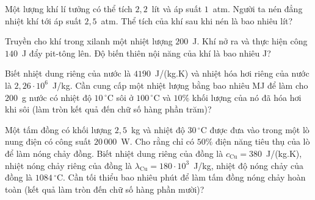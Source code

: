 	\begin{ex}%
		Một lượng khí lí tưởng có thể tích $2{,}2$~lít và áp suất $1$~atm. Người ta nén đẳng nhiệt khí tới áp suất $2{,}5$~atm. Thể tích của khí sau khi nén là bao nhiêu lít?
		\par
	\end{ex}

	\begin{ex}%
		Truyền cho khí trong xilanh một nhiệt lượng $200$~J. Khí nở ra và thực hiện công $140$~J đẩy pit-tông lên. Độ biến thiên nội năng của khí là bao nhiêu J?
		\par
	\end{ex}

	\begin{ex}%
		Biết nhiệt dung riêng của nước là $4190$~J/(kg.K) và nhiệt hóa hơi riêng của nước là $2{,}26\cdot 10^6$~J/kg. Cần cung cấp một nhiệt lượng bằng bao nhiêu MJ để làm cho $200$~g nước có nhiệt độ $10\,^\circ\text{C}$ sôi ở $100\,^\circ\text{C}$ và $10\%$ khối lượng của nó đã hóa hơi khi sôi (làm tròn kết quả đến chữ số hàng phần trăm)?
		\par
	\end{ex}

	\begin{ex}%
		Một tấm đồng có khối lượng $2{,}5$~kg và nhiệt độ $30\,^\circ\text{C}$ được đưa vào trong một lò nung điện có công suất $20\,000$~W. Cho rằng chỉ có $50\%$ điện năng tiêu thụ của lò để làm nóng chảy đồng. Biết nhiệt dung riêng của đồng là $c_\text{Cu}=380$~J/(kg.K), nhiệt nóng chảy riêng của đồng là $\lambda_\text{Cu}=180\cdot 10^3$~J/kg, nhiệt độ nóng chảy của đồng là $1084\,^\circ\text{C}$. Cần tối thiểu bao nhiêu phút để làm tấm đồng nóng chảy hoàn toàn (kết quả làm tròn đến chữ số hàng phần mười)?
		\par
	\end{ex}

